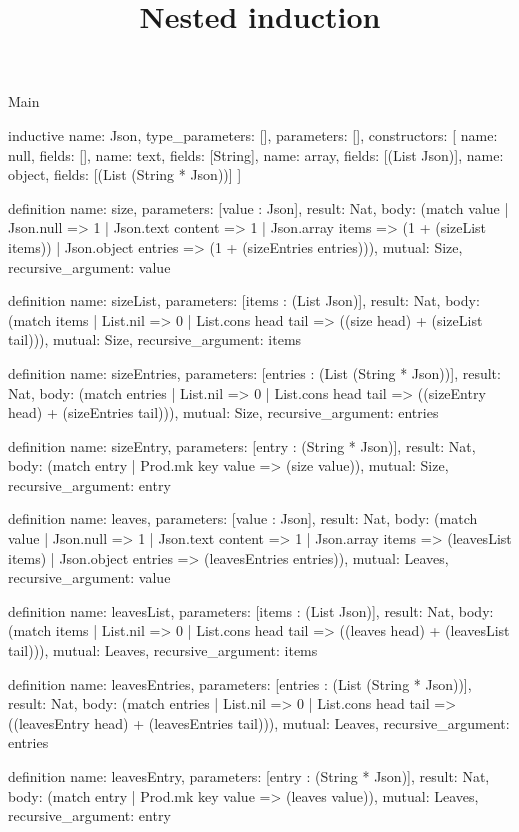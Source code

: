 \begin{lexlean}{Main}
\title{Nested induction}
\begin{semanticmodule}
inductive{
  name: Json,
  type_parameters: [],
  parameters: [],
  constructors: [
    {name: null, fields: []},
    {name: text, fields: [String]},
    {name: array, fields: [(List Json)]},
    {name: object, fields: [(List (String * Json))]}
  ]
}

definition{
  name: size,
  parameters: [value : Json],
  result: Nat,
  body: (match value
    | Json.null => 1
    | Json.text content => 1
    | Json.array items => (1 + (sizeList items))
    | Json.object entries => (1 + (sizeEntries entries))),
  mutual: Size,
  recursive_argument: value
}

definition{
  name: sizeList,
  parameters: [items : (List Json)],
  result: Nat,
  body: (match items | List.nil => 0 | List.cons head tail => ((size head) + (sizeList tail))),
  mutual: Size,
  recursive_argument: items
}

definition{
  name: sizeEntries,
  parameters: [entries : (List (String * Json))],
  result: Nat,
  body: (match entries
    | List.nil => 0
    | List.cons head tail => ((sizeEntry head) + (sizeEntries tail))),
  mutual: Size,
  recursive_argument: entries
}

definition{
  name: sizeEntry,
  parameters: [entry : (String * Json)],
  result: Nat,
  body: (match entry | Prod.mk key value => (size value)),
  mutual: Size,
  recursive_argument: entry
}

definition{
  name: leaves,
  parameters: [value : Json],
  result: Nat,
  body: (match value
    | Json.null => 1
    | Json.text content => 1
    | Json.array items => (leavesList items)
    | Json.object entries => (leavesEntries entries)),
  mutual: Leaves,
  recursive_argument: value
}

definition{
  name: leavesList,
  parameters: [items : (List Json)],
  result: Nat,
  body: (match items | List.nil => 0 | List.cons head tail => ((leaves head) + (leavesList tail))),
  mutual: Leaves,
  recursive_argument: items
}

definition{
  name: leavesEntries,
  parameters: [entries : (List (String * Json))],
  result: Nat,
  body: (match entries
    | List.nil => 0
    | List.cons head tail => ((leavesEntry head) + (leavesEntries tail))),
  mutual: Leaves,
  recursive_argument: entries
}

definition{
  name: leavesEntry,
  parameters: [entry : (String * Json)],
  result: Nat,
  body: (match entry | Prod.mk key value => (leaves value)),
  mutual: Leaves,
  recursive_argument: entry
}


\end{semanticmodule}
\end{lexlean}
